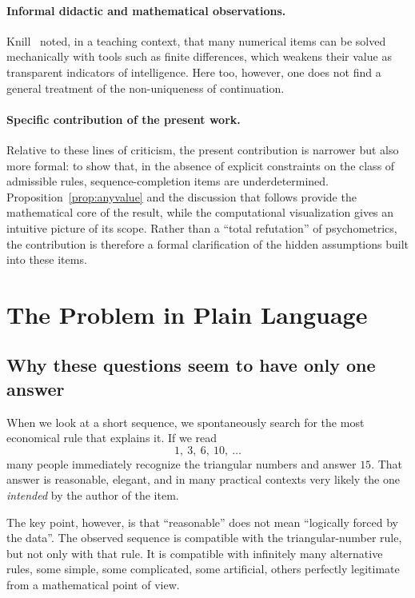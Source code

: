\documentclass[10pt, a4paper]{article}
\theoremstyle{plain}
\theoremstyle{definition}
\theoremstyle{remark}
\begin{document}
\paragraph{Informal didactic and mathematical observations.}
Knill~\cite{knill2014} noted, in a teaching context, that many numerical items
can be solved mechanically with tools such as finite differences, which weakens
their value as transparent indicators of intelligence. Here too, however, one
does not find a general treatment of the non-uniqueness of continuation.

\paragraph{Specific contribution of the present work.}
Relative to these lines of criticism, the present contribution is narrower but
also more formal: to show that, in the absence of explicit constraints on the
class of admissible rules, sequence-completion items are underdetermined.
Proposition~\ref{prop:anyvalue} and the discussion that follows provide the
mathematical core of the result, while the computational visualization gives an
intuitive picture of its scope. Rather than a ``total refutation'' of
psychometrics, the contribution is therefore a formal clarification of the
hidden assumptions built into these items.

\section{The Problem in Plain Language}
\label{sec:plain}

\subsection{Why these questions seem to have only one answer}

When we look at a short sequence, we spontaneously search for the most economical
rule that explains it. If we read
\[
1,\ 3,\ 6,\ 10,\ \dots
\]
many people immediately recognize the triangular numbers and answer $15$. That
answer is reasonable, elegant, and in many practical contexts very likely the
one \emph{intended} by the author of the item.

The key point, however, is that ``reasonable'' does not mean ``logically forced
by the data''. The observed sequence is compatible with the triangular-number
rule, but not only with that rule. It is compatible with infinitely many
alternative rules, some simple, some complicated, some artificial, others
perfectly legitimate from a mathematical point of view.
\end{document}
